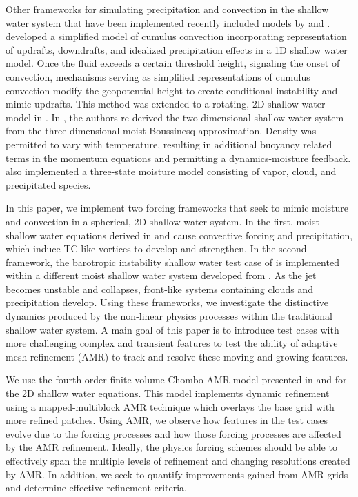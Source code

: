 \documentclass{ametsoc}
\begin{document}
Other frameworks for simulating precipitation and convection in the shallow water
system that have been implemented recently included models by 
\cite{wursch2014simple} and \cite{zerroukat2015moist}.
\cite{wursch2014simple} developed a simplified model of cumulus convection 
incorporating representation of updrafts, downdrafts, and idealized precipitation 
effects in a 1D shallow water model. 
Once the fluid exceeds a certain threshold height, signaling the 
onset of convection, mechanisms serving as simplified representations 
of cumulus convection modify the geopotential height to create
conditional instability and mimic updrafts. 
This method was extended to a rotating, 2D shallow 
water model in \cite{kent2017dynamics}.
In \cite{zerroukat2015moist}, the authors re-derived the two-dimensional
shallow water system from the three-dimensional moist Boussinesq 
approximation. Density was permitted to vary with temperature,
resulting in additional buoyancy related terms in the momentum equations and
permitting a dynamics-moisture feedback. \cite{zerroukat2015moist} also 
implemented a three-state moisture model consisting of vapor, cloud, and 
precipitated species.

In this paper, we implement two forcing frameworks that seek to mimic moisture 
and convection in a spherical, 2D shallow water system. In the first, 
 moist shallow water equations derived in \cite{bouchut2009fronts} and 
\cite{lahaye2016understanding} cause
 convective forcing and precipitation, which induce TC-like vortices to develop and strengthen. In the second 
framework, the barotropic instability shallow water test case of 
\cite{galewsky2004initial} is implemented within a different moist shallow water system developed from 
 \cite{zerroukat2015moist}. As the jet becomes unstable and collapses, front-like 
 systems containing clouds and precipitation develop. Using these frameworks, we
 investigate the distinctive dynamics produced by the non-linear physics processes
 within the traditional shallow water system. A main goal of this paper is to
 introduce test cases with more challenging complex and transient features
 to test the ability of adaptive mesh refinement (AMR) 
 to track and resolve these moving and growing features.
 
 We use the fourth-order finite-volume Chombo AMR model
 presented in \cite{mccorquodale2015adaptive} and
 \cite{ferguson2016analyzing} for the 2D shallow water equations. 
 This model implements dynamic refinement using
 a mapped-multiblock AMR technique which overlays the base grid with more refined patches.
 Using AMR, we observe how features in the test cases evolve due to the forcing 
 processes and how those forcing processes are affected by the AMR refinement. 
Ideally, the physics forcing schemes should be able to effectively span 
the multiple levels of refinement and changing resolutions created by AMR.
 In addition, we seek to quantify improvements gained from AMR grids
 and determine effective refinement criteria.
\end{document}
